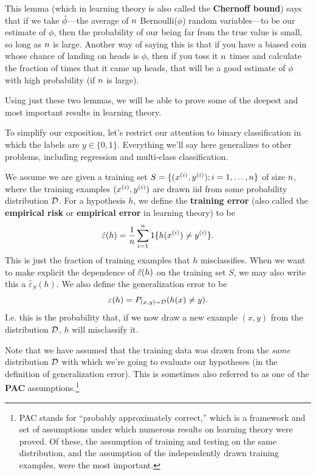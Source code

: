 \documentclass{article} %
\begin{document}
This lemma (which in learning theory is also called the {\bf Chernoff bound})
says that if we take $\hat\phi$---the average of ${n}$
Bernoulli($\phi$) random variables---to be our estimate of $\phi$, then the
probability of our being far from the true value is small, so long as ${n}$ is
large.  Another way of saying this is that if you have a biased coin whose
chance of landing on heads is $\phi$, then if you toss it ${n}$ times and
calculate the fraction of times that it came up heads, that will be a
good estimate of $\phi$ with high probability (if ${n}$ is large).

Using just these two lemmas, we will be able to prove some
of the deepest and most important results in learning theory.

To simplify our exposition, let's restrict our attention to binary
classification in which the labels are $y \in \{0,1\}$.  Everything we'll
say here generalizes to other problems, including regression and multi-class
classification.

We assume we are given a training set $S = \{({x^{(i)}}, {y^{(i)}}); i=1,\ldots,{n}\}$ of size ${n}$,
where the training examples $({x^{(i)}}, {y^{(i)}})$ are drawn iid from
some probability distribution ${\cal D}$.  For a hypothesis $h$, we define the
{\bf training error} (also called the {\bf empirical risk} or {\bf empirical error}
in learning theory) to be
\[
\hat\varepsilon(h) = \frac{1}{{n}}\sum_{i=1}^{n} 1\{h({x^{(i)}}) \neq {y^{(i)}}\}.
\]
This is just the fraction of training examples that $h$ misclassifies.
When we want to make explicit the dependence of $\hat\varepsilon(h)$ on the training set $S$,
we may also write this a $\hat\varepsilon_S(h)$.
We also define the generalization error to be
\[
\varepsilon(h) = P_{(x,y)\sim {\cal D}}(h(x) \neq y).
\]
I.e. this is the probability that, if we now draw a new example $(x,y)$ from the distribution
${\cal D}$, $h$ will misclassify it.

Note that we have assumed that the training data was drawn from the \emph{same}
distribution ${\cal D}$ with which we're going to evaluate our hypotheses
(in the definition of generalization error).  This is
sometimes also referred to as one of the {\bf PAC} assumptions.\footnote{PAC stands
for ``probably approximately correct,'' which is a framework and set of assumptions
under which numerous results on learning theory were proved.  Of these, the
assumption of training and testing on the same distribution, and the assumption
of the independently drawn training examples, were the most important.}
\end{document}
